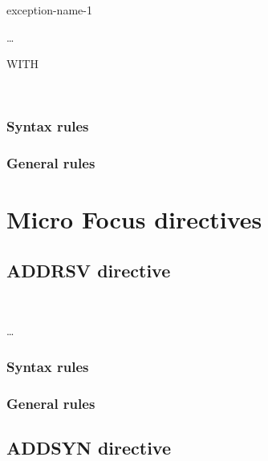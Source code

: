 \begin{syntax}
  \directiveindicator{}
  \begin{1=}
    exception-name-1
  \end{1=} \ldots
  \begin{1=}
    \begin{0-1}
      WITH 
    \end{0-1} \\

  \end{1=}
\end{syntax}

\subsubsection{Syntax rules}

\subsubsection{General rules}

\section{Micro Focus directives}

\subsection{ADDRSV directive}

\begin{syntax}[\miscextcolour]
  \begin{1=}
     \\
  \end{1=}
  \literal \dots %
\end{syntax}

\subsubsection{Syntax rules}

\subsubsection{General rules}

\subsection{ADDSYN directive}

